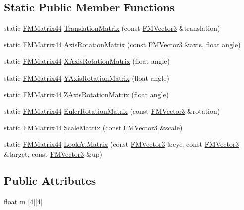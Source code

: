 \subsection*{Static Public Member Functions}
\begin{DoxyCompactItemize}
\item 
static \hyperlink{classFMMatrix44}{FMMatrix44} \hyperlink{classFMMatrix44_a5acef07c11f705a90d8746eb13d01379}{TranslationMatrix} (const \hyperlink{classFMVector3}{FMVector3} \&translation)
\item 
static \hyperlink{classFMMatrix44}{FMMatrix44} \hyperlink{classFMMatrix44_a91daf75ee43a86488849fbf3f8b865f6}{AxisRotationMatrix} (const \hyperlink{classFMVector3}{FMVector3} \&axis, float angle)
\item 
static \hyperlink{classFMMatrix44}{FMMatrix44} \hyperlink{classFMMatrix44_ab2fbbb135c1ef2dfceb2e46c985d99ee}{XAxisRotationMatrix} (float angle)
\item 
static \hyperlink{classFMMatrix44}{FMMatrix44} \hyperlink{classFMMatrix44_ac8eb6bcdb7b7a9e384453df3fcaa4971}{YAxisRotationMatrix} (float angle)
\item 
static \hyperlink{classFMMatrix44}{FMMatrix44} \hyperlink{classFMMatrix44_a224760f24d5df84ee84aad10b191b1fe}{ZAxisRotationMatrix} (float angle)
\item 
static \hyperlink{classFMMatrix44}{FMMatrix44} \hyperlink{classFMMatrix44_a7175333ab00a568082241ac08d7b6c89}{EulerRotationMatrix} (const \hyperlink{classFMVector3}{FMVector3} \&rotation)
\item 
static \hyperlink{classFMMatrix44}{FMMatrix44} \hyperlink{classFMMatrix44_ae87b95958aa655b805d177fdc628edf9}{ScaleMatrix} (const \hyperlink{classFMVector3}{FMVector3} \&scale)
\item 
static \hyperlink{classFMMatrix44}{FMMatrix44} \hyperlink{classFMMatrix44_a426d208ddd9b8a47156b81c5ae0e23bf}{LookAtMatrix} (const \hyperlink{classFMVector3}{FMVector3} \&eye, const \hyperlink{classFMVector3}{FMVector3} \&target, const \hyperlink{classFMVector3}{FMVector3} \&up)
\end{DoxyCompactItemize}
\subsection*{Public Attributes}
\begin{DoxyCompactItemize}
\item 
float \hyperlink{classFMMatrix44_a709b1f27940c291ea1482866d3a165d0}{m} \mbox{[}4\mbox{]}\mbox{[}4\mbox{]}
\end{DoxyCompactItemize}
